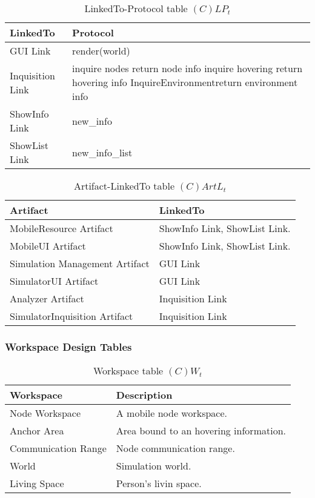 \begin{table}[H]
	\centering
	\begin{tabular}{|p{4cm}|p{8cm}|}
			\hline
			\textbf{LinkedTo} & \textbf{Protocol} \\
			\hline
			GUI Link & render(world) \\
			\hline
			Inquisition Link & inquire nodes \newline return node info \newline inquire
			hovering \newline return hovering info\newline
			InquireEnvironment\newline return environment info \\
			\hline
			ShowInfo Link & new\_info \\
			\hline
			ShowList Link & new\_info\_list \\
			\hline
		\end{tabular}
	\caption{LinkedTo-Protocol table $(C)LP_t$}
	\label{tab:clpt}
\end{table}

\begin{table}[H]
	\centering
	\begin{tabular}{|p{4cm}|p{8cm}|}
			\hline
			\textbf{Artifact} & \textbf{LinkedTo} \\
			\hline
			MobileResource Artifact & ShowInfo Link, ShowList Link. \\
			\hline
			MobileUI Artifact & ShowInfo Link, ShowList Link. \\
			\hline
			Simulation Management Artifact & GUI Link \\
			\hline
			SimulatorUI Artifact & GUI Link \\
			\hline
			Analyzer Artifact & Inquisition Link \\
			\hline
			SimulatorInquisition Artifact & Inquisition Link \\
			\hline
		\end{tabular}
	\caption{Artifact-LinkedTo table $(C)ArtL_t$}
	\label{tab:cartlt}
\end{table}

\subsubsection{Workspace Design Tables}

\begin{table}[H]
	\centering
	\begin{tabular}{|p{4cm}|p{8cm}|}
			\hline
			\textbf{Workspace} & \textbf{Description} \\
			\hline
			Node Workspace  & A mobile node workspace. \\
			\hline
			Anchor Area  & Area bound to an hovering information. \\
			\hline
			Communication Range  & Node communication range. \\
			\hline
			World  & Simulation world. \\
			\hline
			Living  Space & Person's livin space.\\
			\hline
		\end{tabular}
	\caption{Workspace table $(C)W_t$}
	\label{tab:cwt}
\end{table}

